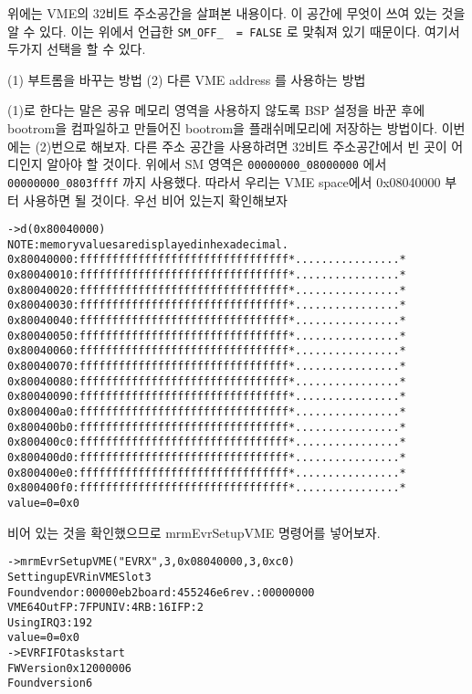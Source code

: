 \documentclass[11pt,a4paper]{article}
\begin{document}
위에는 VME의 32비트 주소공간을 살펴본 내용이다. 이 공간에 무엇이 쓰여 있는 것을 알 수 있다.
이는 위에서 언급한 \verb|SM_OFF_  = FALSE| 로 맞춰져 있기 때문이다. 여기서 두가지 선택을 할 수 있다.

(1) 부트롬을 바꾸는 방법
(2) 다른 VME address 를 사용하는 방법

(1)로 한다는 말은 공유 메모리 영역을 사용하지 않도록 BSP 설정을 바꾼 후에 bootrom을 컴파일하고
만들어진 bootrom을 플래쉬메모리에 저장하는 방법이다.
이번에는 (2)번으로 해보자. 다른 주소 공간을 사용하려면 32비트 주소공간에서 빈 곳이 어디인지 알아야 할 것이다.
위에서 SM 영역은  \verb|00000000_08000000| 에서 \verb|00000000_0803ffff| 까지 사용했다. 따라서 우리는 VME space에서
0x08040000 부터 사용하면 될 것이다. 우선 비어 있는지 확인해보자


\begin{framed}
\begin{alltt}
-> d(0x80040000)
NOTE: memory values are displayed in hexadecimal.
0x80040000:  ffff ffff ffff ffff ffff ffff ffff ffff  *................*
0x80040010:  ffff ffff ffff ffff ffff ffff ffff ffff  *................*
0x80040020:  ffff ffff ffff ffff ffff ffff ffff ffff  *................*
0x80040030:  ffff ffff ffff ffff ffff ffff ffff ffff  *................*
0x80040040:  ffff ffff ffff ffff ffff ffff ffff ffff  *................*
0x80040050:  ffff ffff ffff ffff ffff ffff ffff ffff  *................*
0x80040060:  ffff ffff ffff ffff ffff ffff ffff ffff  *................*
0x80040070:  ffff ffff ffff ffff ffff ffff ffff ffff  *................*
0x80040080:  ffff ffff ffff ffff ffff ffff ffff ffff  *................*
0x80040090:  ffff ffff ffff ffff ffff ffff ffff ffff  *................*
0x800400a0:  ffff ffff ffff ffff ffff ffff ffff ffff  *................*
0x800400b0:  ffff ffff ffff ffff ffff ffff ffff ffff  *................*
0x800400c0:  ffff ffff ffff ffff ffff ffff ffff ffff  *................*
0x800400d0:  ffff ffff ffff ffff ffff ffff ffff ffff  *................*
0x800400e0:  ffff ffff ffff ffff ffff ffff ffff ffff  *................*
0x800400f0:  ffff ffff ffff ffff ffff ffff ffff ffff  *................*
value = 0 = 0x0
\end{alltt}
\end{framed}

비어 있는 것을 확인했으므로 mrmEvrSetupVME 명령어를 넣어보자.

\begin{framed}
\begin{alltt}
-> mrmEvrSetupVME("EVRX",3,0x08040000,3,0xc0)
Setting up EVR in VME Slot 3
Found vendor: 00000eb2 board: 455246e6 rev.: 00000000
VME64 Out FP:7 FPUNIV:4 RB:16 IFP:2
Using IRQ 3:192
value = 0 = 0x0
-> EVR FIFO task start
FWVersion 0x12000006
Found version 6
\end{alltt}
\end{framed}
\end{document}
